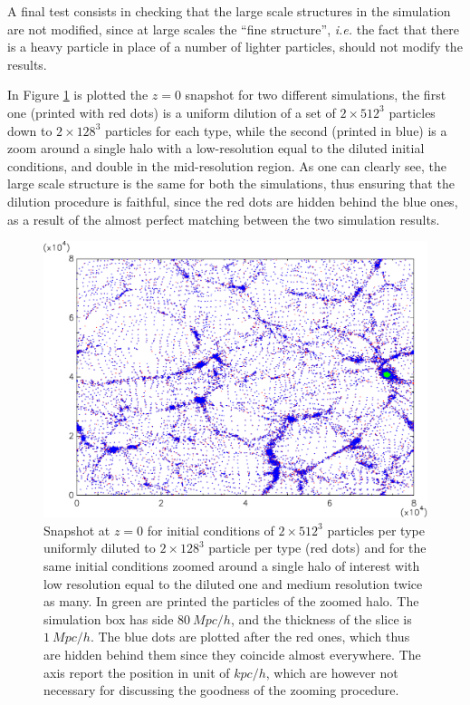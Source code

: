 \documentclass[11pt,a4paper,titlepage]{article}
\newcommand{\virg}[1]{``{#1}''}
\newcommand{\ie}{\emph{i.e.}\xspace}
\begin{document}
A final test consists in checking that the large scale structures in the simulation are not modified, since at large scales the \virg{fine structure}, \ie the fact that there is a heavy particle in place of a number of lighter particles, should not modify the results.

In Figure \ref{Dilution} is plotted the $z=0$ snapshot for two different simulations, the first one (printed with red dots) is a uniform dilution of a set of $2 \times 512^3$ particles down to $2 \times 128^3$ particles for each type, while the second (printed in blue) is a zoom around a single halo with a low-resolution equal to the diluted initial conditions, and double in the mid-resolution region. As one can clearly see, the large scale structure is the same for both the simulations, thus ensuring that the dilution procedure is faithful, since the red dots are hidden behind the blue ones, as a result of the almost perfect matching between the two simulation results.

\begin{figure}[!tbp]
\centering
\includegraphics[width=\textwidth]{Slice_Dilute_vs_Zoom.pdf}
\caption{Snapshot at $z=0$ for initial conditions of $2 \times 512^3$ particles per type uniformly diluted to $2 \times 128^3$ particle per type (red dots) and for the same initial conditions zoomed around a single halo of interest with low resolution equal to the diluted one and medium resolution twice as many. In green are printed the particles of the zoomed halo. The simulation box has side $80~Mpc/h$, and the thickness of the slice is $1~Mpc/h$. The blue dots are plotted after the red ones, which thus are hidden behind them since they coincide almost everywhere. The axis report the position in unit of $kpc/h$, which are however not necessary for discussing the goodness of the zooming procedure.}
\label{Dilution}
\end{figure}
\end{document}
